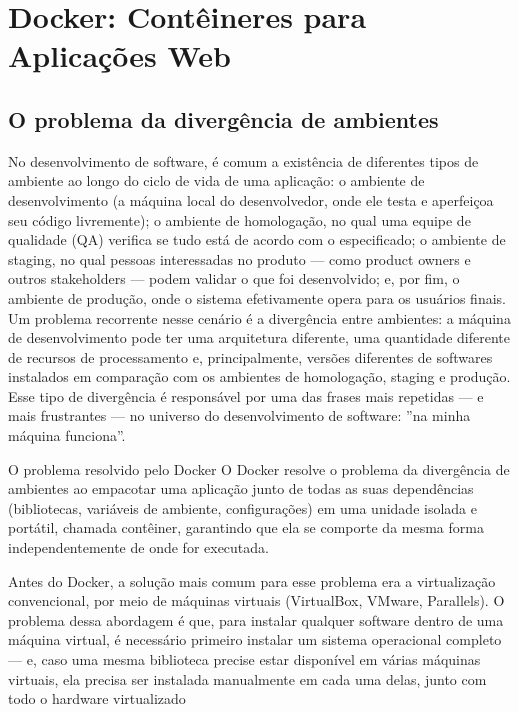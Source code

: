 \chapter{Docker: Contêineres para Aplicações Web}

\section{O problema da divergência de ambientes}

No desenvolvimento de software, é comum a existência de diferentes tipos de ambiente ao longo do ciclo de vida de uma aplicação: o ambiente de desenvolvimento (a máquina local do desenvolvedor, onde ele testa e aperfeiçoa seu código livremente); o ambiente de homologação, no qual uma equipe de qualidade (QA) verifica se tudo está de acordo com o especificado; o ambiente de staging, no qual pessoas interessadas no produto — como product owners e outros stakeholders — podem validar o que foi desenvolvido; e, por fim, o ambiente de produção, onde o sistema efetivamente opera para os usuários finais. Um problema recorrente nesse cenário é a divergência entre ambientes: a máquina de desenvolvimento pode ter uma arquitetura diferente, uma quantidade diferente de recursos de processamento e, principalmente, versões diferentes de softwares instalados em comparação com os ambientes de homologação, staging e produção. Esse tipo de divergência é responsável por uma das frases mais repetidas — e mais frustrantes — no universo do desenvolvimento de software: ”na minha máquina funciona”.

\begin{infobox}{O problema resolvido pelo Docker}
O Docker resolve o problema da divergência de ambientes ao empacotar uma aplicação junto de todas as suas dependências (bibliotecas, variáveis de ambiente, configurações) em uma unidade isolada e portátil, chamada contêiner, garantindo que ela se comporte da mesma forma independentemente de onde for executada.
\end{infobox}

Antes do Docker, a solução mais comum para esse problema era a virtualização convencional, por meio de máquinas virtuais (VirtualBox, VMware, Parallels). O problema dessa abordagem é que, para instalar qualquer software dentro de uma máquina virtual, é necessário primeiro instalar um sistema operacional completo — e, caso uma mesma biblioteca precise estar disponível em várias máquinas virtuais, ela precisa ser instalada manualmente em cada uma delas, junto com todo o hardware virtualizado

